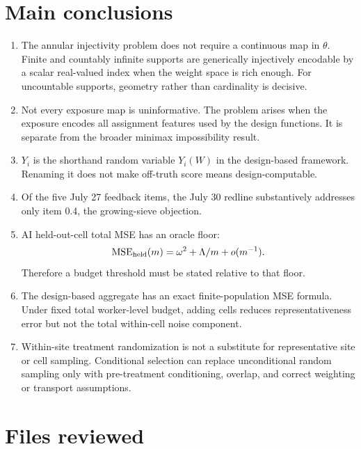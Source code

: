 \documentclass[11pt]{article}
\newcommand{\MSE}{\operatorname{MSE}}
\begin{document}
\section*{Main conclusions}

\begin{enumerate}[leftmargin=2em]
    \item The annular injectivity problem does not require a continuous map in
    \(\theta\). Finite and countably infinite supports are generically
    injectively encodable by a scalar real-valued index when the weight space
    is rich enough. For uncountable supports, geometry rather than cardinality
    is decisive.
    \item Not every exposure map is uninformative. The problem arises when the
    exposure encodes all assignment features used by the design functions.
    It is separate from the broader minimax impossibility result.
    \item \(Y_i\) is the shorthand random variable \(Y_i(W)\) in the
    design-based framework. Renaming it does not make off-truth score means
    design-computable.
    \item Of the five July 27 feedback items, the July 30 redline
    substantively addresses only item 0.4, the growing-sieve objection.
    \item AI held-out-cell total MSE has an oracle floor:
    \[
        \MSE_{\rm held}(m)=\omega^2+\Lambda/m+o(m^{-1}).
    \]
    Therefore a budget threshold must be stated relative to that floor.
    \item The design-based aggregate has an exact finite-population MSE
    formula. Under fixed total worker-level budget, adding cells reduces
    representativeness error but not the total within-cell noise component.
    \item Within-site treatment randomization is not a substitute for
    representative site or cell sampling. Conditional selection can replace
    unconditional random sampling only with pre-treatment conditioning,
    overlap, and correct weighting or transport assumptions.
\end{enumerate}

\section*{Files reviewed}
\end{document}
